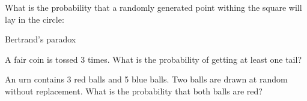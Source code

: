\bigskip




\begin{problem}
What is the probability that a randomly generated point withing the square will lay in the circle:
\begin{center}
\end{center}
\end{problem}

\begin{problem}
    Bertrand's paradox
\end{problem}

\begin{problem}
A fair coin is tossed 3 times. What is the probability of getting at least one tail?
\end{problem}
        

\begin{problem}
    An urn contains 3 red balls and 5 blue balls. Two balls are drawn at random without replacement. What is the probability that both balls are red?
\end{problem}

